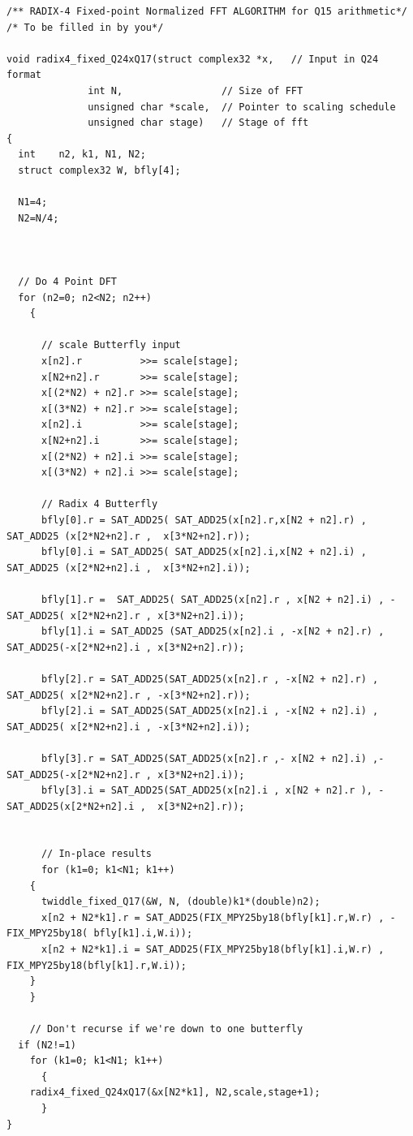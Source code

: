 \documentclass{article}
\begin{document}
\begin{lstlisting}
/** RADIX-4 Fixed-point Normalized FFT ALGORITHM for Q15 arithmetic*/
/* To be filled in by you*/

void radix4_fixed_Q24xQ17(struct complex32 *x,   // Input in Q24 format 
			  int N,                 // Size of FFT
			  unsigned char *scale,  // Pointer to scaling schedule
			  unsigned char stage)   // Stage of fft
{ 
  int    n2, k1, N1, N2;
  struct complex32 W, bfly[4];

  N1=4;
  N2=N/4;
    


  // Do 4 Point DFT  
  for (n2=0; n2<N2; n2++)
    {

      // scale Butterfly input
      x[n2].r          >>= scale[stage];
      x[N2+n2].r       >>= scale[stage];
      x[(2*N2) + n2].r >>= scale[stage];
      x[(3*N2) + n2].r >>= scale[stage];
      x[n2].i          >>= scale[stage];
      x[N2+n2].i       >>= scale[stage];
      x[(2*N2) + n2].i >>= scale[stage];
      x[(3*N2) + n2].i >>= scale[stage];
      
      // Radix 4 Butterfly 
      bfly[0].r = SAT_ADD25( SAT_ADD25(x[n2].r,x[N2 + n2].r) , SAT_ADD25 (x[2*N2+n2].r ,  x[3*N2+n2].r));
      bfly[0].i = SAT_ADD25( SAT_ADD25(x[n2].i,x[N2 + n2].i) , SAT_ADD25 (x[2*N2+n2].i ,  x[3*N2+n2].i));

      bfly[1].r =  SAT_ADD25( SAT_ADD25(x[n2].r , x[N2 + n2].i) , - SAT_ADD25( x[2*N2+n2].r , x[3*N2+n2].i));
      bfly[1].i = SAT_ADD25 (SAT_ADD25(x[n2].i , -x[N2 + n2].r) , SAT_ADD25(-x[2*N2+n2].i , x[3*N2+n2].r));

      bfly[2].r = SAT_ADD25(SAT_ADD25(x[n2].r , -x[N2 + n2].r) , SAT_ADD25( x[2*N2+n2].r , -x[3*N2+n2].r));
      bfly[2].i = SAT_ADD25(SAT_ADD25(x[n2].i , -x[N2 + n2].i) , SAT_ADD25( x[2*N2+n2].i , -x[3*N2+n2].i));

      bfly[3].r = SAT_ADD25(SAT_ADD25(x[n2].r ,- x[N2 + n2].i) ,- SAT_ADD25(-x[2*N2+n2].r , x[3*N2+n2].i));
      bfly[3].i = SAT_ADD25(SAT_ADD25(x[n2].i , x[N2 + n2].r ), -SAT_ADD25(x[2*N2+n2].i ,  x[3*N2+n2].r));


      // In-place results
      for (k1=0; k1<N1; k1++)
	{
	  twiddle_fixed_Q17(&W, N, (double)k1*(double)n2);
	  x[n2 + N2*k1].r = SAT_ADD25(FIX_MPY25by18(bfly[k1].r,W.r) , -FIX_MPY25by18( bfly[k1].i,W.i));
      x[n2 + N2*k1].i = SAT_ADD25(FIX_MPY25by18(bfly[k1].i,W.r) , FIX_MPY25by18(bfly[k1].r,W.i));
	}
    }
    
    // Don't recurse if we're down to one butterfly 
  if (N2!=1)
    for (k1=0; k1<N1; k1++)
      {
	radix4_fixed_Q24xQ17(&x[N2*k1], N2,scale,stage+1);
      }
}



\end{lstlisting}
\end{document}
